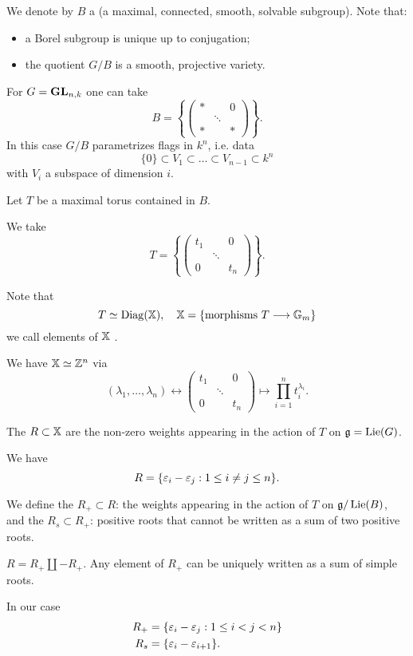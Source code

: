 	We denote by $B$ a  (a maximal, connected, smooth, solvable
	subgroup). Note that:
	\begin{itemize}
		\item a Borel subgroup is unique up to conjugation;
		\item the quotient $G /B$ is a smooth, projective variety.
	\end{itemize}
	\begin{example}
	 For $G=\mathbf{GL}_{n,k}$ one can take
	 \[
			B = \left\{
				\begin{pmatrix} * & & 0 \\ & \ddots & \\ * & & *
			\end{pmatrix}  \right\} .
	 \]
	 In this case $G /B$ parametrizes flags in $k^{n}$, i.e. data
	 \[
	  \{0\} \subset V_1\subset \dots\subset V_{n-1}\subset k^{n}
	 \]
	 with $V_i$ a subspace of dimension $i$.
	\end{example}
	Let $T$ be a maximal torus contained in $B$.
	\begin{example}
		We take
		\[
			T = \left\{
				\begin{pmatrix} t_1 & & 0 \\ & \ddots \\ 0 & & t_n
			\end{pmatrix}  \right\} .
		\]
	\end{example}
	Note that
	\[
		T\isoto \Diag(\XX),\quad \XX = \{\text{morphisms }T\to \Gm\}
	\]
	we call elements of $\mathbb{X}$ .
	\begin{example}
		We have $\mathbb{X}\simeq \mathbb Z^{n}$ via
		\[
			(\lambda_1,\dots,\lambda_n) \leftrightarrow
			\begin{pmatrix} t_1 & & 0 \\ & \ddots \\ 0 & & t_n
			\end{pmatrix} \mapsto \prod_{i=1}^{n} t_i^{\lambda_i} .
		\]
	\end{example}
	The  $R\subset \mathbb{X}$ are the non-zero weights appearing in the action of $T$
	on $\mathfrak g=\operatorname{Lie}(G)$.
	\begin{example}
		We have
		\[
			R = \{\varepsilon_i - \varepsilon_j: 1\le i\neq j \le n\} .
		\]
	\end{example}
	We define the  $R_+\subset R$: the weights appearing in the action
	of $T$ on $\mathfrak g /\operatorname{Lie}(B)$, and the  $R_s\subset R_+$: positive roots
	that cannot be written as a sum of two positive roots.
	\begin{note}
		$R=R_+ \coprod -R_{+}$. Any element of $R_+$ can be uniquely written as a sum of simple roots.
	\end{note}
	\begin{example}
		In our case
		\begin{align*}
			R_+ &= \{\varepsilon_i - \varepsilon_j:1\le i<j<n\} \\
			R_s &= \{\varepsilon_i - \varepsilon_{i+1}\} .
		\end{align*}
	\end{example}

